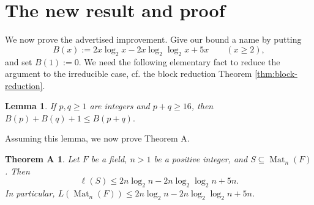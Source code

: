 \documentclass[11pt]{article}
\renewcommand{\geq}{\geqslant}
\renewcommand{\leq}{\leqslant}
\newcommand{\Mat}{\operatorname{Mat}}
\newtheorem{auxiliary proposition}[theorem]{Auxiliary Proposition}
\newtheorem{lemma}[theorem]{Lemma}
\newtheorem{main conjecture}[theorem]{Main Conjecture}
\newtheorem{main theorem}[theorem]{Main Theorem}
\newtheorem{modesty proposition}[theorem]{Modesty Proposition}
\newtheorem{open problem}[theorem]{Open Problem}
\newtheorem{convergence lemma}[theorem]{Convergence Lemma}
\newtheorem{corrected lemma}[theorem]{Corrected Lemma}
\newtheorem{growth lemma}[theorem]{Growth Lemma}
\newtheorem{coefficient lemma}[theorem]{Integrality Lemma}
\newtheorem{interpolation lemma}[theorem]{Interpolation Lemma}
\newtheorem{kernel lemma}[theorem]{Kernel Lemma}
\newtheorem{limit lemma}[theorem]{Limit Lemma}
\newtheorem{tandem lemma}[theorem]{Modesty Lemma}
\newtheorem{zero-finding lemma}[theorem]{Zero-Finding Lemma}
\newtheorem*{theoremA}{Theorem A}
\numberwithin{equation}{section}
\begin{document}

\section{The new result and proof}

We now prove the advertised improvement.  Give our bound a name by putting $$B(x):=2x\log_2 x-2x\log_2\log_2 x+5x\qquad(x\geq 2),$$ and set $B(1):=0$.  We need the following elementary fact to reduce the argument to the irreducible case, cf. the block reduction Theorem \ref{thm:block-reduction}.


\begin{lemma}
\label{lem:subadditive-B}
If $p,q\geq 1$ are integers and $p+q\geq 16$, then $ B(p)+B(q)+1\leq B(p+q).
$

\end{lemma}

Assuming this lemma, we now prove Theorem A.

\begin{theoremA}
Let $F$ be a field, $n>1$ be a positive integer, and $S\subseteq\Mat_n(F)$.  Then $$\ell(S)\leq2n\log_2 n-2n\log_2\log_2 n+5n.$$
In particular, $L(\Mat_n(F))\leq 2n\log_2 n-2n\log_2\log_2 n+5n$.
\end{theoremA}
\end{document}
